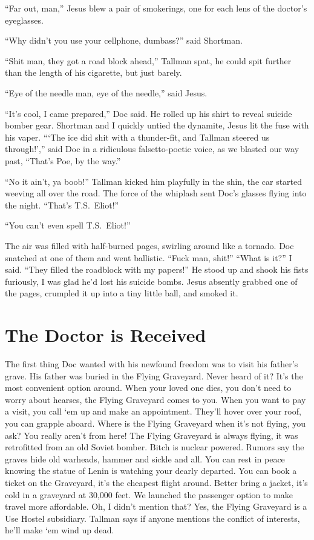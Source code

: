 \documentclass[oneside]{book}
\begin{document}
``Far out, man,'' Jesus blew a pair of smokerings, one for each lens of the doctor's
eyeglasses.

``Why didn't you use your cellphone, dumbass?'' said Shortman.


``Shit man, they got a road block ahead,'' Tallman spat, he could spit further than
the length of his cigarette, but just barely.

``Eye of the needle man, eye of the needle,'' said Jesus.

``It's cool, I came prepared,'' Doc said.  He rolled up his shirt to reveal suicide
bomber gear.  Shortman and I quickly untied the dynamite, Jesus lit the fuse with his
vaper.  ``{`}The ice did shit with a thunder-fit, and Tallman steered us through!{'},''
said Doc in a ridiculous falsetto-poetic voice, as we blasted our way past, ``That's Poe, by the way.''

``No it ain't, ya boob!''  Tallman kicked him playfully in the shin, the car started
weeving all over the road.  The force of the whiplash sent Doc's glasses flying into the night.
``That's T.S.~Eliot!''

``You can't even spell T.S.~Eliot!''

The air was filled with half-burned pages, swirling around like a tornado.  Doc snatched
at one of them and went ballistic.  ``Fuck man, shit!''  ``What is it?'' I said.  ``They
filled the roadblock with my papers!''  He stood up and shook his fists furiously,
I was glad he'd lost his suicide bombs.
Jesus absently grabbed one of the pages, crumpled it up into
a tiny little ball, and smoked it.



\chapter{The Doctor is Received}

The first thing Doc wanted with his newfound freedom was to visit
his father's grave.
His father was buried in the Flying
Graveyard.  Never heard of it?  It's the most
convenient option around.  When your loved one dies, you don't need to worry about
hearses, the Flying Graveyard comes to you.  When you
want to pay a visit, you call `em up and make
an appointment.  They'll hover over your roof,
you can grapple aboard.  Where is the Flying Graveyard when it's
not flying, you ask?  You really aren't from here!  The Flying Graveyard is always
flying, it was retrofitted from an old Soviet bomber.  Bitch is nuclear
powered.  Rumors say the
graves hide old warheads, hammer and sickle and all.  You can rest in peace knowing
the statue of Lenin is watching your dearly departed.
You can book a ticket on the Graveyard,
it's the cheapest flight around.  Better bring a jacket, it's cold in a
graveyard at 30,000 feet.  We launched the passenger option
to make travel more affordable.  Oh, I didn't mention that?
Yes, the Flying Graveyard is a Use Hostel subsidiary.  Tallman says
if anyone mentions the conflict of interests, he'll make `em wind up dead.
\end{document}
